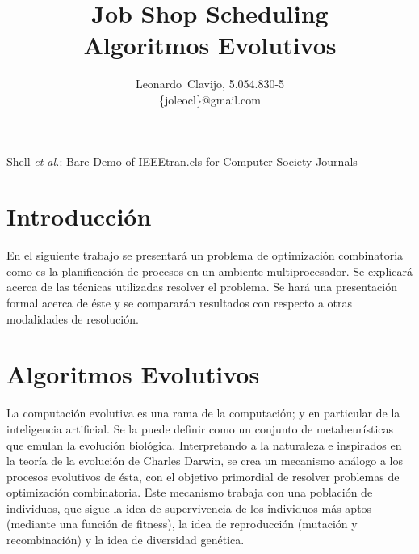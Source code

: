 \documentclass[journal]{IEEEtran}
\begin{document}
\title{Job Shop Scheduling\\ Algoritmos Evolutivos}


\author{
Leonardo~Clavijo, 5.054.830-5\\
\{joleocl\}@gmail.com
}

%
{Shell \MakeLowercase{\textit{et al.}}: Bare Demo of IEEEtran.cls for Computer Society Journals}



\maketitle

\IEEEdisplaynontitleabstractindextext

\IEEEpeerreviewmaketitle


\section{Introducción}
En el siguiente trabajo se presentará un problema de optimización combinatoria como es la planificación de procesos en un ambiente multiprocesador. Se explicará acerca de las técnicas utilizadas resolver el problema. Se hará una presentación formal acerca de éste y se compararán resultados con respecto a otras modalidades de resolución.

\section{Algoritmos Evolutivos}
La computación evolutiva es una rama de la computación; y en particular de la inteligencia artificial. Se la puede definir como un conjunto de metaheurísticas que emulan la evolución biológica. Interpretando a la naturaleza e inspirados en la teoría de la evolución de Charles Darwin, se crea un mecanismo análogo a los procesos evolutivos de ésta, con el objetivo primordial de resolver problemas de optimización combinatoria. 
	Este mecanismo trabaja con una población de individuos, que sigue la idea de supervivencia de los individuos más aptos (mediante una función de fitness), la idea de reproducción (mutación y recombinación) y la idea de diversidad genética.
\end{document}
